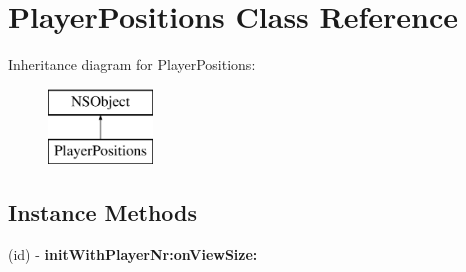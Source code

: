 \hypertarget{interface_player_positions}{\section{Player\+Positions Class Reference}
\label{interface_player_positions}
}
Inheritance diagram for Player\+Positions\+:\begin{figure}[H]
\begin{center}
\leavevmode
\includegraphics[height=2.000000cm]{interface_player_positions}
\end{center}
\end{figure}
\subsection*{Instance Methods}
\begin{DoxyCompactItemize}
\item 
\hypertarget{interface_player_positions_ac42b194b23965031cf1a0ba992629c73}{(id) -\/ {\bfseries init\+With\+Player\+Nr\+:on\+View\+Size\+:}}\label{interface_player_positions_ac42b194b23965031cf1a0ba992629c73}

\end{DoxyCompactItemize}
